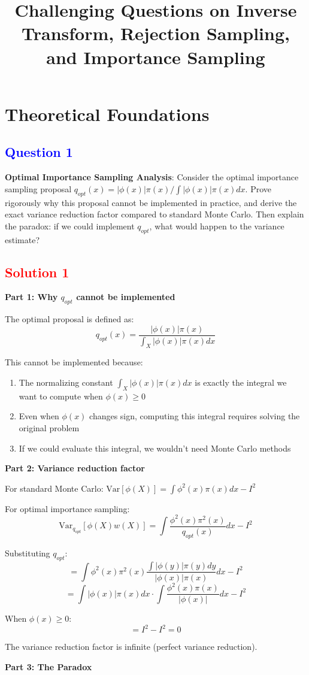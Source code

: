 \documentclass[11pt]{article}
\title{\textbf{Challenging Questions on Inverse Transform, Rejection Sampling,\\
and Importance Sampling}}
\date{}
\newcommand{\question}[1]{\subsection*{\textcolor{blue}{Question #1}}}
\newcommand{\solution}[1]{\subsection*{\textcolor{red}{Solution #1}}}
\begin{document}
\maketitle

\section{Theoretical Foundations}

\question{1}
\textbf{Optimal Importance Sampling Analysis}: Consider the optimal importance sampling proposal $q_{opt}(x) = |\phi(x)|\pi(x) / \int |\phi(x)|\pi(x)dx$. Prove rigorously why this proposal cannot be implemented in practice, and derive the exact variance reduction factor compared to standard Monte Carlo. Then explain the paradox: if we could implement $q_{opt}$, what would happen to the variance estimate?

\solution{1}
\textbf{Part 1: Why $q_{opt}$ cannot be implemented}

The optimal proposal is defined as:
$$q_{opt}(x) = \frac{|\phi(x)|\pi(x)}{\int_X |\phi(x)|\pi(x)dx}$$

This cannot be implemented because:
\begin{enumerate}
\item The normalizing constant $\int_X |\phi(x)|\pi(x)dx$ is exactly the integral we want to compute when $\phi(x) \geq 0$
\item Even when $\phi(x)$ changes sign, computing this integral requires solving the original problem
\item If we could evaluate this integral, we wouldn't need Monte Carlo methods
\end{enumerate}

\textbf{Part 2: Variance reduction factor}

For standard Monte Carlo: $\text{Var}[\phi(X)] = \int \phi^2(x)\pi(x)dx - I^2$

For optimal importance sampling:
$$\text{Var}_{q_{opt}}[\phi(X)w(X)] = \int \frac{\phi^2(x)\pi^2(x)}{q_{opt}(x)}dx - I^2$$

Substituting $q_{opt}$:
$$= \int \phi^2(x)\pi^2(x) \frac{\int |\phi(y)|\pi(y)dy}{|\phi(x)|\pi(x)}dx - I^2$$
$$= \int |\phi(x)|\pi(x)dx \cdot \int \frac{\phi^2(x)\pi(x)}{|\phi(x)|}dx - I^2$$

When $\phi(x) \geq 0$:
$$= I^2 - I^2 = 0$$

The variance reduction factor is infinite (perfect variance reduction).

\textbf{Part 3: The Paradox}
\end{document}

